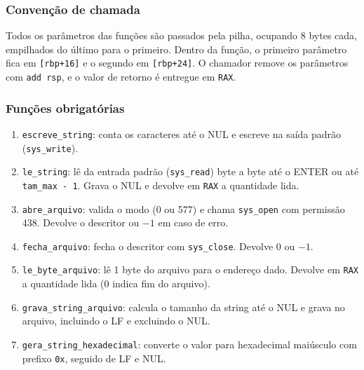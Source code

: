 \documentclass[12pt,a4paper]{article}
\begin{document}
\subsubsection*{Convenção de chamada}
Todos os parâmetros das funções são passados pela pilha, ocupando 8 bytes cada, empilhados do último para o primeiro. Dentro da função, o primeiro parâmetro fica em \texttt{[rbp+16]} e o segundo em \texttt{[rbp+24]}. O chamador remove os parâmetros com \texttt{add rsp}, e o valor de retorno é entregue em \texttt{RAX}.

\subsubsection*{Funções obrigatórias}
\begin{enumerate}
    \item \texttt{escreve\_string}: conta os caracteres até o NUL e escreve na saída padrão (\texttt{sys\_write}).
    \item \texttt{le\_string}: lê da entrada padrão (\texttt{sys\_read}) byte a byte até o ENTER ou até \texttt{tam\_max - 1}. Grava o NUL e devolve em \texttt{RAX} a quantidade lida.
    \item \texttt{abre\_arquivo}: valida o modo (0 ou 577) e chama \texttt{sys\_open} com permissão 438. Devolve o descritor ou $-1$ em caso de erro.
    \item \texttt{fecha\_arquivo}: fecha o descritor com \texttt{sys\_close}. Devolve 0 ou $-1$.
    \item \texttt{le\_byte\_arquivo}: lê 1 byte do arquivo para o endereço dado. Devolve em \texttt{RAX} a quantidade lida (0 indica fim do arquivo).
    \item \texttt{grava\_string\_arquivo}: calcula o tamanho da string até o NUL e grava no arquivo, incluindo o LF e excluindo o NUL.
    \item \texttt{gera\_string\_hexadecimal}: converte o valor para hexadecimal maiúsculo com prefixo \texttt{0x}, seguido de LF e NUL. 
\end{enumerate}
\end{document}
